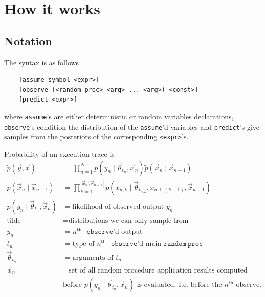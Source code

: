 \section{How it works}
\subsection{Notation}
The syntax is as follows
\begin{verbatim}
	[assume symbol <expr>]
	[observe (<random proc> <arg> ... <arg>) <const>]
	[predict <expr>]
\end{verbatim}
where \verb!assume!'s are either deterministic or random variables declarations, \verb!observe!'s condition the distribution of the \verb!assume!'d variables and \verb!predict!'s give samples from the posteriors of the corresponding \verb!<expr>!'s.

Probability of an execution trace is
\begin{align}
	\tilde p(\vec y, \vec x) 				&= \prod_{n = 1}^N p(y_n \mid \vec \theta_{t_n}, \vec x_n) \tilde p(\vec x_n \mid \vec x_{n - 1}) \\
	\tilde p(\vec x_n \mid \vec x_{n - 1}) 	&= \prod_{k = 1}^{|\vec x_n \setminus \vec x_{n - 1}|} p(x_{n, k} \mid \vec \theta_{t_{n, k}}, x_{n, 1:(k - 1)}, \vec x_{n - 1}) \\
	p(y_n \mid \vec \theta_{t_n}, \vec x_n)	&= \text{likelihood of observed output } y_n \\
	\text{tilde}							&= \text{distributions we can only sample from} \\
	y_n										&= n^{\text{th}} \text{ }\mathtt{observe}\text{'d output} \\
	t_n										&= \text{type of } n^{\text{th}} \text{ }\mathtt{observe}\text{'d main }\mathtt{random\ proc} \\
	\vec \theta_{t_n}						&= \text{arguments of } t_n \\
	\vec x_n								&= \text{set of all random procedure application results computed } \nonumber\\
											&\text{before }p(y_n \mid \vec \theta_{t_n}, \vec x_n) \text{ is evaluated. I.e. before the } n^{\text{th}} \text{ observe.}
\end{align}

